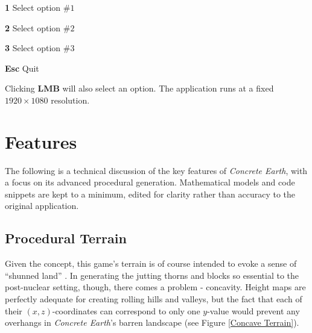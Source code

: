 \documentclass[a4paper, 11pt]{article}
\begin{document}
\begin{flushleft}
\begin{center}
{\vspace{2.5pt}\noindent 
\textbf{1} \dotfill{} Select option \#$1$

\vspace{2.5pt}\noindent 
\textbf{2} \dotfill{} Select option \#$2$

\vspace{2.5pt}\noindent 
\textbf{3} \dotfill{} Select option \#$3$

\vspace{2.5pt}\noindent 
\textbf{Esc} \dotfill{} Quit
}\linebreak
\end{center}

Clicking \textbf{LMB} will also select an option. The application runs at a fixed $1920 \times 1080$ resolution.

\section{Features}\label{Features}

The following is a technical discussion of the key features of \textit{Concrete Earth}, with a focus on its advanced procedural generation. Mathematical models and code snippets are kept to a minimum, edited for clarity rather than accuracy to the original application.


\subsection{Procedural Terrain}\label{Procedural Terrain} %

Given the concept, this game's terrain is of course intended to evoke a sense of ``shunned land'' \citep{trth93}. In generating the jutting thorns and blocks so essential to the post-nuclear setting, though, there comes a problem - concavity. Height maps are perfectly adequate for creating rolling hills and valleys, but the fact that each of their $(x,z)$-coordinates can correspond to only one $y$-value would prevent any overhangs in \textit{Concrete Earth}'s barren landscape (see Figure \ref{Concave Terrain}).


\end{flushleft}
\end{document}
